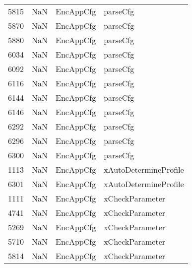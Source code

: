 \begin{tabular}{llll}
5815 &                   NaN &                  EncAppCfg &                                  parseCfg \\
5870 &                   NaN &                  EncAppCfg &                                  parseCfg \\
5880 &                   NaN &                  EncAppCfg &                                  parseCfg \\
6034 &                   NaN &                  EncAppCfg &                                  parseCfg \\
6092 &                   NaN &                  EncAppCfg &                                  parseCfg \\
6116 &                   NaN &                  EncAppCfg &                                  parseCfg \\
6144 &                   NaN &                  EncAppCfg &                                  parseCfg \\
6146 &                   NaN &                  EncAppCfg &                                  parseCfg \\
6292 &                   NaN &                  EncAppCfg &                                  parseCfg \\
6296 &                   NaN &                  EncAppCfg &                                  parseCfg \\
6300 &                   NaN &                  EncAppCfg &                                  parseCfg \\
1113 &                   NaN &                  EncAppCfg &                     xAutoDetermineProfile \\
6301 &                   NaN &                  EncAppCfg &                     xAutoDetermineProfile \\
1111 &                   NaN &                  EncAppCfg &                           xCheckParameter \\
4741 &                   NaN &                  EncAppCfg &                           xCheckParameter \\
5269 &                   NaN &                  EncAppCfg &                           xCheckParameter \\
5710 &                   NaN &                  EncAppCfg &                           xCheckParameter \\
5814 &                   NaN &                  EncAppCfg &                           xCheckParameter \\

\end{tabular}
